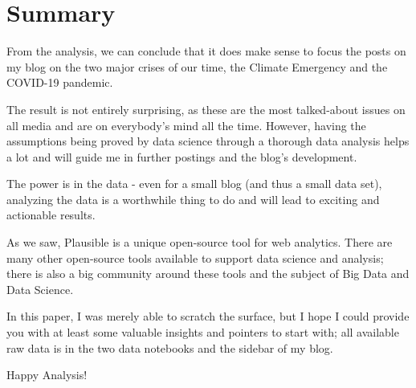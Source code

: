 %
%

\pagebreak
\section{Summary}

\onehalfspacing

From the analysis, we can conclude that it does make sense to focus the posts on my blog on the two major crises of our time, the Climate Emergency and the COVID-19 pandemic.

The result is not entirely surprising, as these are the most talked-about issues on all media and are on everybody's mind all the time. However, having the assumptions being proved by data science through a thorough data analysis helps a lot and will guide me in further postings and the blog's development.

The power is in the data - even for a small blog (and thus a small data set), analyzing the data is a worthwhile thing to do and will lead to exciting and actionable results.

As we saw, Plausible is a unique open-source tool for web analytics. There are many other open-source tools available to support data science and analysis; there is also a big community around these tools and the subject of Big Data and Data Science. 

In this paper, I was merely able to scratch the surface, but I hope I could provide you with at least some valuable insights and pointers to start with; all available raw data is in the two data notebooks and the sidebar of my blog.

Happy Analysis!
